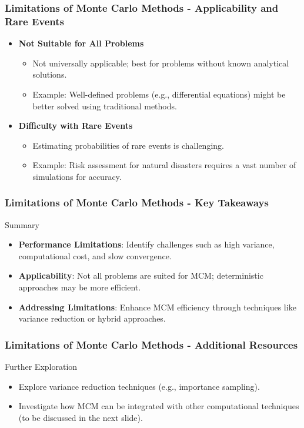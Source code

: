 \documentclass[aspectratio=169]{beamer}
\begin{document}
\begin{frame}[fragile]
  \frametitle{Limitations of Monte Carlo Methods - Applicability and Rare Events}
  \begin{itemize}
    \item \textbf{Not Suitable for All Problems}
      \begin{itemize}
        \item Not universally applicable; best for problems without known analytical solutions.
        \item Example: Well-defined problems (e.g., differential equations) might be better solved using traditional methods.
      \end{itemize}

    \item \textbf{Difficulty with Rare Events}
      \begin{itemize}
        \item Estimating probabilities of rare events is challenging.
        \item Example: Risk assessment for natural disasters requires a vast number of simulations for accuracy.
      \end{itemize}
  \end{itemize}
\end{frame}

\begin{frame}[fragile]
  \frametitle{Limitations of Monte Carlo Methods - Key Takeaways}
  \begin{block}{Summary}
    \begin{itemize}
      \item \textbf{Performance Limitations}: Identify challenges such as high variance, computational cost, and slow convergence.
      \item \textbf{Applicability}: Not all problems are suited for MCM; deterministic approaches may be more efficient.
      \item \textbf{Addressing Limitations}: Enhance MCM efficiency through techniques like variance reduction or hybrid approaches.
    \end{itemize}
  \end{block}
\end{frame}

\begin{frame}[fragile]
  \frametitle{Limitations of Monte Carlo Methods - Additional Resources}
  \begin{block}{Further Exploration}
    \begin{itemize}
      \item Explore variance reduction techniques (e.g., importance sampling).
      \item Investigate how MCM can be integrated with other computational techniques (to be discussed in the next slide).
    \end{itemize}
  \end{block}
\end{frame}
\end{document}
